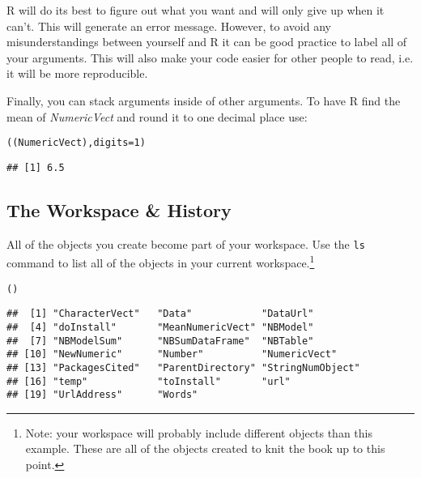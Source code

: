 \noindent R will do its best to figure out what you want and will only give up when it can't. This will generate an error message. However, to avoid any misunderstandings between yourself and R it can be good practice to label all of your arguments. This will also make your code easier for other people to read, i.e. it will be more reproducible.

Finally, you can stack arguments inside of other arguments. To have R find the mean of {\emph{NumericVect}} and round it to one decimal place use:

\begin{knitrout}
\color{fgcolor}\begin{kframe}
\begin{alltt}
((NumericVect), digits = 1)
\end{alltt}
\begin{verbatim}
## [1] 6.5
\end{verbatim}
\end{kframe}
\end{knitrout}


\subsection{The Workspace \& History}

All of the objects you create become part of your workspace. Use the \texttt{ls} command to list all of the objects in your current workspace.\footnote{Note: your workspace will probably include different objects than this example. These are all of the objects created to knit the book up to this point.}

\begin{knitrout}
\color{fgcolor}\begin{kframe}
\begin{alltt}
()
\end{alltt}
\begin{verbatim}
##  [1] "CharacterVect"   "Data"            "DataUrl"        
##  [4] "doInstall"       "MeanNumericVect" "NBModel"        
##  [7] "NBModelSum"      "NBSumDataFrame"  "NBTable"        
## [10] "NewNumeric"      "Number"          "NumericVect"    
## [13] "PackagesCited"   "ParentDirectory" "StringNumObject"
## [16] "temp"            "toInstall"       "url"            
## [19] "UrlAddress"      "Words"
\end{verbatim}
\end{kframe}
\end{knitrout}


